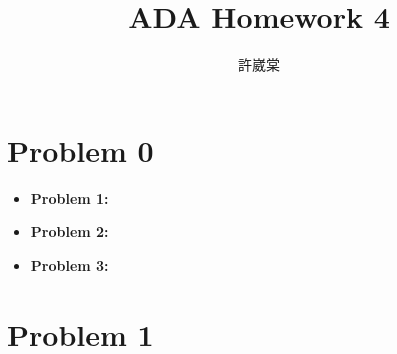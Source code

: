 \documentclass{homework}
\author{許崴棠}
\title{ADA Homework 4}
\begin{document}
\maketitle
\section*{Problem 0}
\begin{itemize}
    \item \textbf{Problem 1:} 
    \item \textbf{Problem 2:} 
    \item \textbf{Problem 3:} 
\end{itemize}
\clearpage
\section*{Problem 1}
\end{document}
